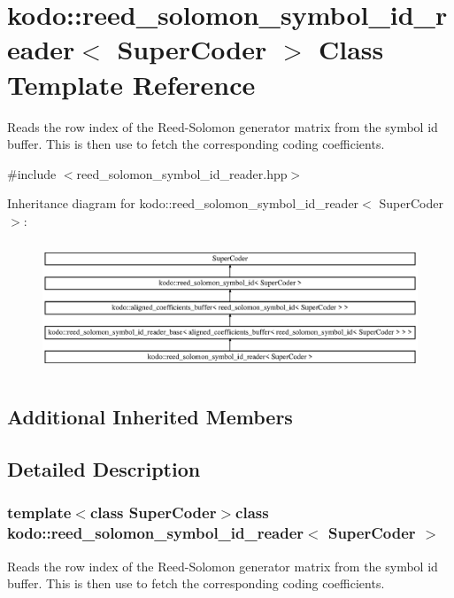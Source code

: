 \hypertarget{classkodo_1_1reed__solomon__symbol__id__reader}{\section{kodo\-:\-:reed\-\_\-solomon\-\_\-symbol\-\_\-id\-\_\-reader$<$ Super\-Coder $>$ Class Template Reference}
\label{classkodo_1_1reed__solomon__symbol__id__reader}
}


Reads the row index of the Reed-\/\-Solomon generator matrix from the symbol id buffer. This is then use to fetch the corresponding coding coefficients.  




{\ttfamily \#include $<$reed\-\_\-solomon\-\_\-symbol\-\_\-id\-\_\-reader.\-hpp$>$}

Inheritance diagram for kodo\-:\-:reed\-\_\-solomon\-\_\-symbol\-\_\-id\-\_\-reader$<$ Super\-Coder $>$\-:\begin{figure}[H]
\begin{center}
\leavevmode
\includegraphics[height=3.938116cm]{classkodo_1_1reed__solomon__symbol__id__reader}
\end{center}
\end{figure}
\subsection*{Additional Inherited Members}


\subsection{Detailed Description}
\subsubsection*{template$<$class Super\-Coder$>$class kodo\-::reed\-\_\-solomon\-\_\-symbol\-\_\-id\-\_\-reader$<$ Super\-Coder $>$}

Reads the row index of the Reed-\/\-Solomon generator matrix from the symbol id buffer. This is then use to fetch the corresponding coding coefficients. 

